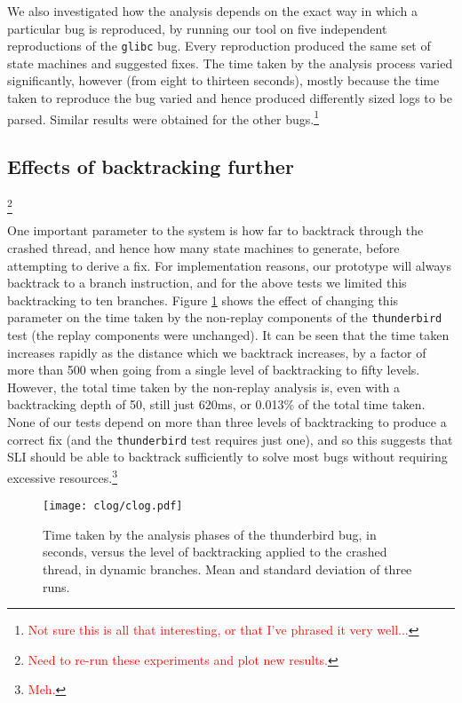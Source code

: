 \documentclass[10pt,twocolumn,preprint,natbib,authoryear]{sigplanconf}
\newcommand{\editorial}[1]{\textcolor{red}{\footnote{\textcolor{red}{#1}}}}
\begin{document}
We also investigated how the analysis depends on the exact way in 
which a particular bug is reproduced, by running our tool
on five independent reproductions of the \verb|glibc| bug.  Every
reproduction produced the same set of state machines and suggested
fixes.  The time taken by the analysis process varied significantly,
however (from eight to thirteen seconds), mostly because the time
taken to reproduce the bug varied and hence produced differently sized
logs to be parsed. Similar results were obtained for the other
bugs.\editorial{Not sure this is all that interesting, or that I've
  phrased it very well...}

\subsection{Effects of backtracking further}\editorial{Need to re-run these experiments and plot new results.}
\label{sect:eval:backtrack}

One important parameter to the system is how far to backtrack through
the crashed thread, and hence how many state machines to generate,
before attempting to derive a fix.  For implementation reasons, our
prototype will always backtrack to a branch instruction, and for the
above tests we limited this backtracking to ten branches.  Figure
\ref{fig:eval:backtrack} shows the effect of changing this parameter
on the time taken by the non-replay components of the
\verb|thunderbird| test (the replay components were unchanged).  It
can be seen that the time taken increases rapidly as the distance
which we backtrack increases, by a factor of more than 500 when going
from a single level of backtracking to fifty levels.  However, the
total time taken by the non-replay analysis is, even with a
backtracking depth of 50, still just 620ms, or 0.013\% of the total
time taken.  None of our tests depend on more than three levels of
backtracking to produce a correct fix (and the \verb|thunderbird| test
requires just one), and so this suggests that SLI should be able to
backtrack sufficiently to solve most bugs without requiring excessive
resources.\editorial{Meh.}

\begin{figure}
\texttt{[image: clog/clog.pdf]}
\caption{Time taken by the analysis phases of the thunderbird bug, in
  seconds, versus the level of backtracking applied to the crashed
  thread, in dynamic branches.  Mean and standard deviation of three
  runs.}
\label{fig:eval:backtrack}
\end{figure}
\end{document}
